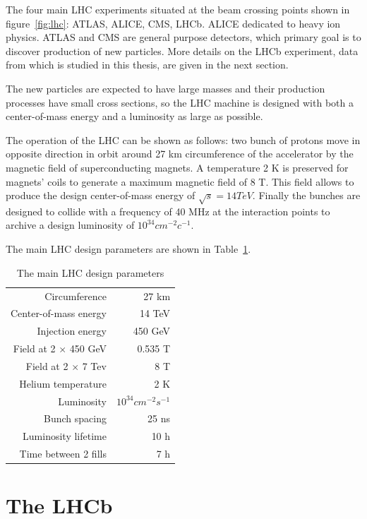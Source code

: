 The four main LHC experiments situated at the beam crossing points shown in
figure~\ref{fig:lhc}: ATLAS, ALICE, CMS, LHCb. ALICE dedicated to heavy ion
physics. ATLAS and CMS are general purpose detectors, which primary goal
is to discover production of new particles. More details on the 
LHCb experiment, data from which is studied in this thesis, are given
in the next section.

The new particles are expected to have large masses and their production
processes have small cross sections, so the LHC machine is designed with both
a center-of-mass energy and a luminosity as large as possible.

The operation of the LHC can be shown as follows: two bunch of protons move in
opposite direction in orbit around 27 km circumference of the accelerator by
the magnetic field of superconducting magnets. A temperature 2 K is preserved
for magnets' coils to generate a maximum magnetic field of 8 T.  This field
allows to produce the design center-of-mass energy of $\sqrt{s}=14 TeV$.
Finally the bunches are designed to collide with a frequency of 40 MHz at the
interaction points to archive a design luminosity of $10^{34}cm^{-2}c^{-1}$.

The main LHC design parameters are shown in Table~\ref{tab:lhc}.

\begin{table}[t]
    \caption{\small The main LHC design parameters}
    \centering
    \begin{tabular}{r|r}
        Circumference  &  27 km\\
        Center-of-mass energy &  14 TeV\\
        Injection energy  &  450 GeV\\
        Field at 2 $\times$ 450 GeV  &  0.535 T\\
        Field at 2 $\times$ 7 Tev & 8 T\\
        Helium temperature & 2 K\\
        Luminosity & $10^{34}cm^{-2}s^{-1}$\\
        Bunch spacing  & 25 ns\\
        Luminosity lifetime & 10 h\\
        Time between 2 fills  &  7 h\\
    \end{tabular}
    \label{tab:lhc}
\end{table}

\section{The LHCb}
\label{ch_lhcb:lhcb}

